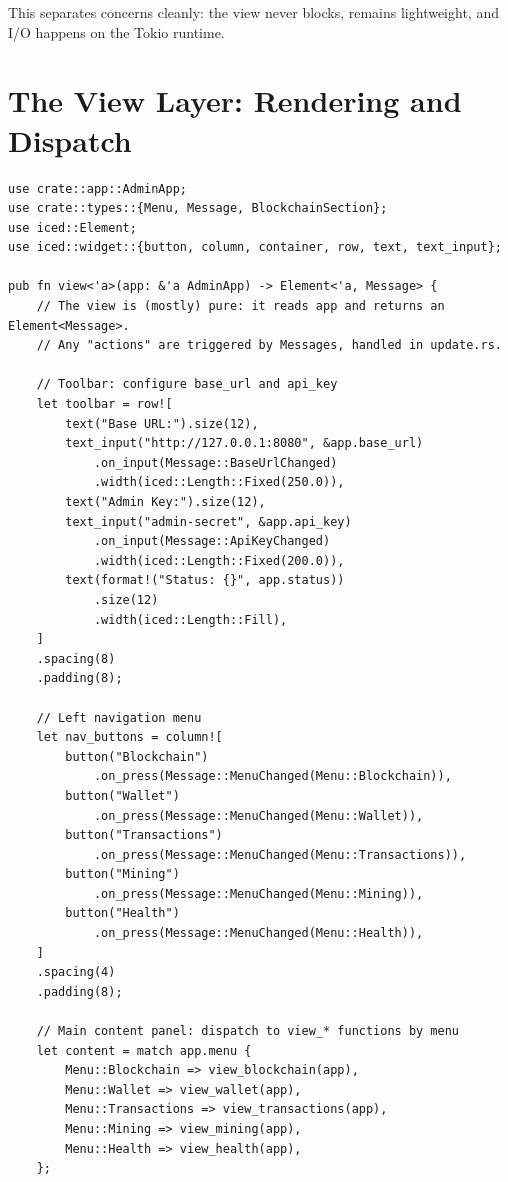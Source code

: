 This separates concerns cleanly: the view never blocks,  remains lightweight, and I/O happens on the Tokio runtime.

\section{The View Layer: Rendering and Dispatch}
\label{sec:ch16-view}

\begin{listing}[H]
\caption{View function (excerpt) ()}
\label{lst:ch16-view}
\begin{verbatim}
use crate::app::AdminApp;
use crate::types::{Menu, Message, BlockchainSection};
use iced::Element;
use iced::widget::{button, column, container, row, text, text_input};

pub fn view<'a>(app: &'a AdminApp) -> Element<'a, Message> {
    // The view is (mostly) pure: it reads app and returns an Element<Message>.
    // Any "actions" are triggered by Messages, handled in update.rs.

    // Toolbar: configure base_url and api_key
    let toolbar = row![
        text("Base URL:").size(12),
        text_input("http://127.0.0.1:8080", &app.base_url)
            .on_input(Message::BaseUrlChanged)
            .width(iced::Length::Fixed(250.0)),
        text("Admin Key:").size(12),
        text_input("admin-secret", &app.api_key)
            .on_input(Message::ApiKeyChanged)
            .width(iced::Length::Fixed(200.0)),
        text(format!("Status: {}", app.status))
            .size(12)
            .width(iced::Length::Fill),
    ]
    .spacing(8)
    .padding(8);

    // Left navigation menu
    let nav_buttons = column![
        button("Blockchain")
            .on_press(Message::MenuChanged(Menu::Blockchain)),
        button("Wallet")
            .on_press(Message::MenuChanged(Menu::Wallet)),
        button("Transactions")
            .on_press(Message::MenuChanged(Menu::Transactions)),
        button("Mining")
            .on_press(Message::MenuChanged(Menu::Mining)),
        button("Health")
            .on_press(Message::MenuChanged(Menu::Health)),
    ]
    .spacing(4)
    .padding(8);

    // Main content panel: dispatch to view_* functions by menu
    let content = match app.menu {
        Menu::Blockchain => view_blockchain(app),
        Menu::Wallet => view_wallet(app),
        Menu::Transactions => view_transactions(app),
        Menu::Mining => view_mining(app),
        Menu::Health => view_health(app),
    };


\end{verbatim}
\end{listing}
